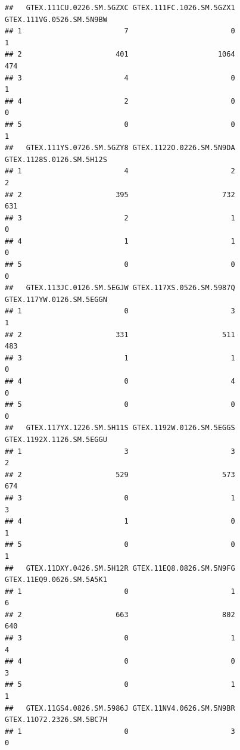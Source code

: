 \documentclass[]{article}
\begin{document}
\begin{verbatim}
##   GTEX.111CU.0226.SM.5GZXC GTEX.111FC.1026.SM.5GZX1 GTEX.111VG.0526.SM.5N9BW
## 1                        7                        0                        1
## 2                      401                     1064                      474
## 3                        4                        0                        1
## 4                        2                        0                        0
## 5                        0                        0                        1
##   GTEX.111YS.0726.SM.5GZY8 GTEX.1122O.0226.SM.5N9DA GTEX.1128S.0126.SM.5H12S
## 1                        4                        2                        2
## 2                      395                      732                      631
## 3                        2                        1                        0
## 4                        1                        1                        0
## 5                        0                        0                        0
##   GTEX.113JC.0126.SM.5EGJW GTEX.117XS.0526.SM.5987Q GTEX.117YW.0126.SM.5EGGN
## 1                        0                        3                        1
## 2                      331                      511                      483
## 3                        1                        1                        0
## 4                        0                        4                        0
## 5                        0                        0                        0
##   GTEX.117YX.1226.SM.5H11S GTEX.1192W.0126.SM.5EGGS GTEX.1192X.1126.SM.5EGGU
## 1                        3                        3                        2
## 2                      529                      573                      674
## 3                        0                        1                        3
## 4                        1                        0                        1
## 5                        0                        0                        1
##   GTEX.11DXY.0426.SM.5H12R GTEX.11EQ8.0826.SM.5N9FG GTEX.11EQ9.0626.SM.5A5K1
## 1                        0                        1                        6
## 2                      663                      802                      640
## 3                        0                        1                        4
## 4                        0                        0                        3
## 5                        0                        1                        1
##   GTEX.11GS4.0826.SM.5986J GTEX.11NV4.0626.SM.5N9BR GTEX.11O72.2326.SM.5BC7H
## 1                        0                        3                        0

\end{verbatim}
\end{document}
